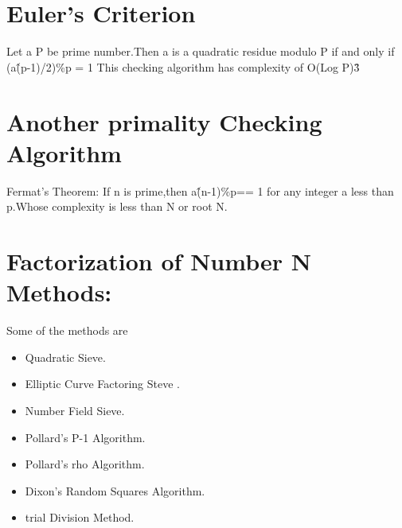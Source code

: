 \documentclass[12pt,a4paper]{report}
\begin{document}
\section*{Euler's Criterion}
Let a P be prime number.Then a is a quadratic residue 	modulo P if and only if\newline
(a\^(p-1)/2)\%p = 1\newline
This checking algorithm has complexity of O(Log P)\^3
\section*{Another primality Checking Algorithm }
Fermat's Theorem:
If n is prime,then a\^(n-1)\%p== 1 for any integer a less than p.Whose complexity is less than N or root N.
\section*{Factorization of Number N Methods:}
Some of the methods are
\begin{itemize}
\item Quadratic Sieve.
\item Elliptic Curve Factoring Steve .
\item Number Field Sieve.
\item Pollard's P-1 Algorithm.
\item Pollard's rho Algorithm.
\item Dixon's Random Squares Algorithm.
\item trial Division Method.
\end{itemize}
\end{document}
